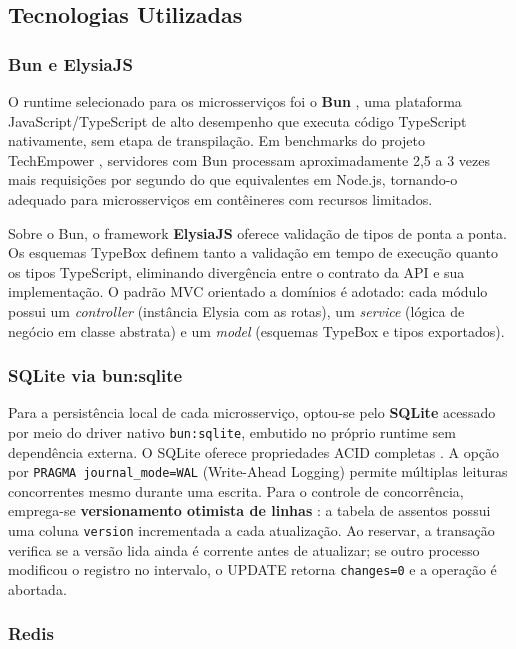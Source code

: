 \documentclass[12pt]{article}
\begin{document}
\subsection{Tecnologias Utilizadas}

\subsubsection{Bun e ElysiaJS}

O runtime selecionado para os microsserviços foi o \textbf{Bun} \cite{ovensH2023}, uma
plataforma JavaScript/TypeScript de alto desempenho que executa código TypeScript
nativamente, sem etapa de transpilação. Em benchmarks do projeto TechEmpower
\cite{techempower2024}, servidores com Bun processam aproximadamente 2{,}5 a 3 vezes
mais requisições por segundo do que equivalentes em Node.js, tornando-o adequado para
microsserviços em contêineres com recursos limitados.

Sobre o Bun, o framework \textbf{ElysiaJS} \cite{saltyaom2023} oferece validação de
tipos de ponta a ponta. Os esquemas TypeBox definem tanto a validação em tempo de
execução quanto os tipos TypeScript, eliminando divergência entre o contrato da API
e sua implementação. O padrão MVC orientado a domínios é adotado: cada módulo possui
um \textit{controller} (instância Elysia com as rotas), um \textit{service} (lógica de
negócio em classe abstrata) e um \textit{model} (esquemas TypeBox e tipos exportados).

\subsubsection{SQLite via bun:sqlite}

Para a persistência local de cada microsserviço, optou-se pelo \textbf{SQLite} acessado
por meio do driver nativo \texttt{bun:sqlite}, embutido no próprio runtime sem
dependência externa. O SQLite oferece propriedades ACID completas \cite{date2003}. A
opção por \texttt{PRAGMA journal\_mode=WAL} (Write-Ahead Logging) permite múltiplas
leituras concorrentes mesmo durante uma escrita. Para o controle de concorrência,
emprega-se \textbf{versionamento otimista de linhas} \cite{bernstein1987}: a tabela de
assentos possui uma coluna \texttt{version} incrementada a cada atualização. Ao
reservar, a transação verifica se a versão lida ainda é corrente antes de atualizar;
se outro processo modificou o registro no intervalo, o UPDATE retorna \texttt{changes=0}
e a operação é abortada.

\subsubsection{Redis}
\end{document}
